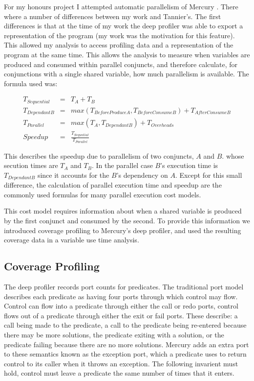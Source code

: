 For my honours project I attempted automatic parallelism of Mercury
\citep{paul_hons}.
There where a number of differences between my work and Tannier's.
The first differences is that at the time of my work the deep profiler
was able to export a representation of the program
(my work was the motivation for this feature).
This allowed my analysis to access profiling data and a representation
of the program at the same time.
This allows the analysis to measure when variables are produced and
consumed within parallel conjuncts,
and therefore calculate,
for conjunctions with a single shared variable,
how much parallelism is available.
The formula used was:

\begin{eqnarray*}
T_{Sequential} & = & T_A + T_B \\
T_{DependantB} & = & max(T_{BeforeProduceA}, T_{BeforeConsumeB}) +
T_{AfterConsumeB} \\
T_{Parallel} & = & max(T_A, T_{DependantB}) + T_{Overheads} \\
Speedup & = & \frac{T_{Sequntial}}{T_{Parallel}}
\end{eqnarray*}

This describes the speedup due to parallelism of two conjuncts, $A$ and $B$.
whose secution times are $T_A$ and $T_B$.
In the parallel case $B$'s execution time is $T_{DependantB}$ since it
accounts for the $B$'s dependency on $A$.
Except for this small difference,
the calculation of parallel execution time and speedup are the commonly
used formulas for many parallel execution cost models.

This cost model requires information about when a shared variable is
produced by the first conjunct and consumed by the second.
To provide this information we introduced coverage profiling to
Mercury's deep profiler,
and used the resulting coverage data in a variable use time analysis.

\subsection{Coverage Profiling}
\label{sec:coverage}

The deep profiler records port counts for predicates.
The traditional port model~\cite{port_model} describes each predicate as
having four ports through which control may flow.
Control can flow into a predicate through either the call or redo ports,
control flows out of a predicate through either the exit or fail ports.
These describe:
    a call being made to the predicate,
    a call to the predicate being re-entered because there may be more
    solutions,
    the predicate exiting with a solution,
    or the predicate failing because there are no more solutions.
Mercury adds an extra port to these semantics known as the exception port,
which a predicate uses to return control to its caller when it throws an
exception.
The following invarient must hold,
control must leave a predicate the same number of times that it enters.

